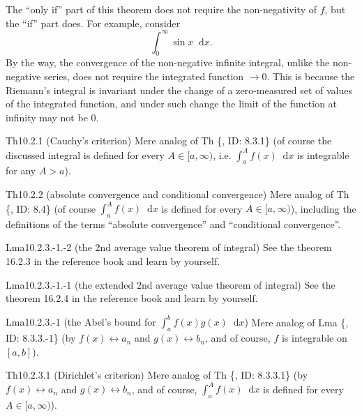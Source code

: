 \documentclass{article}
\newcommand{\dif}{\mathop{}\!\mathrm{d}}
\begin{document}
\begin{Rmk}{}
    \textcolor{Th}{The ``only if'' part of this theorem does not require the non-negativity of $f$, but the ``if'' part does.} For example, consider 
    $$ \int_0^\infty \sin x \dif x. $$
    By the way, \textcolor{Th}{the convergence of the non-negative infinite integral, unlike the non-negative series, does not require the integrated function $\rightarrow 0$.} This is because the Riemann's integral is invariant under the change of a zero-measured set of values of the integrated function, and under such change the limit of the function at infinity may not be $0$.
\end{Rmk}

\begin{Th}{Th10.2.1 (Cauchy's criterion)}
    Mere analog of Th \{, ID: 8.3.1\} (of course the discussed integral is defined for every $A\in [a, \infty)$, i.e. \textcolor{Df}{$\int_a^{A} f(x)\dif x$ is integrable for any $A>a$}).
\end{Th}

\begin{Th}{Th10.2.2 (absolute convergence and conditional convergence)}
    Mere analog of Th \{, ID: 8.4\} (of course $\int_a^A f(x)\dif x$ is defined for every $A\in [a, \infty)$), \textcolor{Df}{including the definitions of the terms ``absolute convergence'' and ``conditional convergence''.}
\end{Th}

\begin{Th}{Lma10.2.3.-1.-2 (the 2nd average value theorem of integral)}
    See the theorem 16.2.3 in the reference book and learn by yourself.
\end{Th}

\begin{Th}{Lma10.2.3.-1.-1 (the extended 2nd average value theorem of integral)}
    See the theorem 16.2.4 in the reference book and learn by yourself.
\end{Th}

\begin{Th}{Lma10.2.3.-1 (the Abel's bound for $\int_a^b f(x)g(x)\dif x$)}
    Mere analog of Lma \{, ID: 8.3.3.-1\} (by $f(x) \leftrightarrow a_n$ and $g(x) \leftrightarrow b_n$, and of course, $f$ is integrable on $[a, b]$).
\end{Th}

\begin{Th}{Th10.2.3.1 (Dirichlet's criterion)}
    Mere analog of Th \{, ID: 8.3.3.1\} (by $f(x) \leftrightarrow a_n$ and $g(x) \leftrightarrow b_n$, and of course, $\int_a^A f(x)\dif x$ is defined for every $A\in [a, \infty)$). 
\end{Th}
\end{document}
